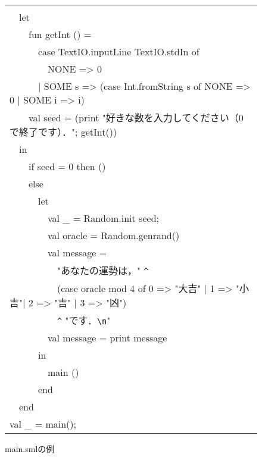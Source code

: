 \documentclass{jbook}
\newcommand{\myem}{\mbox{\ \ }}
\newenvironment{program}{\begin{quote}\begin{tt}}%
                        {\end{tt}\end{quote}}
\begin{document}
\begin{figure}[b]
\begin{center}
\begin{tabular}{l}
\begin{minipage}{0.9\textwidth}
\begin{program}
fun main() =\\
\myem  let\\
\myem\myem    fun getInt () = \\
\myem\myem\myem        case TextIO.inputLine TextIO.stdIn of\\
\myem\myem\myem\ \       NONE => 0\\
\myem\myem\myem        | SOME s => (case Int.fromString s of NONE => 0 | SOME i => i)\\
\myem\myem    val seed = (print "好きな数を入力してください（0で終了です）．";  getInt())\\
\myem  in\\
\myem\myem    if seed = 0 then ()\\
\myem\myem    else\\
\myem\myem\myem      let\\
\myem\myem\myem\myem        val \_ = Random.init seed;\\
\myem\myem\myem\myem        val oracle = Random.genrand()\\
\myem\myem\myem\myem        val message = \\
\myem\myem\myem\myem\myem            "あなたの運勢は，" \verb|^|\\
\myem\myem\myem\myem\myem            (case oracle mod 4 of 0 => "大吉" | 1 => "小吉"| 2 => "吉" | 3 => "凶")\\
\myem\myem\myem\myem\myem            \verb|^| "です．\verb|\n|"\\
\myem\myem\myem\myem        val message = print message\\
\myem\myem\myem      in\\
\myem\myem\myem\myem        main ()\\
\myem\myem\myem      end\\
\myem  end\\
val \_ = main();
\end{program}
\end{minipage}
\end{tabular}
\caption{main.smlの例}
\label{fig:main}
\end{center}
\end{figure}
\end{document}
